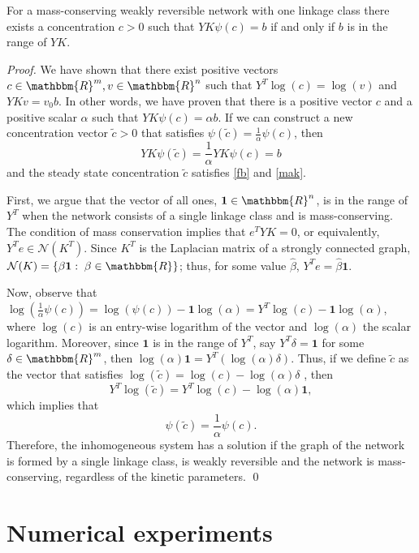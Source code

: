 \documentclass[smallextended]{svjour3}       %
\newcommand*{\0}{\mathbf{0}}
\newcommand*{\1}{\mathbf{1}}
\newcommand*{\R}{\mathbbm{R}}
\begin{document}
\begin{theorem}\label{thm:scaling}
	For a mass-conserving weakly reversible network with one linkage class there exists a
	concentration $c>0$ such that $YK\psi(c) = b$ if and only if $b$ is in the
	range of $YK$. 
\end{theorem}

\begin{proof}
	We have shown that there exist positive vectors $c \in \R^m, v \in \R^n$ such
	that $Y^T \log(c) = \log (v)$ and $Y K v = v_0 b$.  In other words, we have
	proven that there is a positive vector $c$ and a positive scalar $\alpha$
	such that $Y K \psi(c) = \alpha b$.  If we can construct a new
	concentration vector $\tilde c > 0$ that satisfies $\psi(\tilde c) =
	\frac{1}{\alpha}\psi(c)$, then
	\[
		YK\psi(\tilde c) = \frac{1}{\alpha}YK\psi(c) = b
	\]
	and the steady state concentration $\tilde c$ satisfies \eqref{fb} and
	\eqref{mak}.  

	First, we argue that the vector of all ones, $\1 \in \R^n$, is in the range
	of $Y^T$ when the network consists of a single linkage class and
	is mass-conserving. The condition of mass conservation implies that $e^T Y K = 0$, 
	or equivalently, $Y^T e \in \mathcal{N} (K^T)$.  Since $K^T$ is the 
	Laplacian matrix of a strongly connected graph, $\mathcal{N}(K) = \{\beta
	\1 :\; \beta \in \R\}$; thus, for some value $\hat \beta$, $Y^T e = \hat\beta
	\1$. 
	
	Now, observe that $\log\left(\frac{1}{\alpha}\psi(c) \right) =
	\log(\psi(c))-\1\log(\alpha) = Y^T\log(c) - \1\log(\alpha)$, where $\log(c)$
	is an entry-wise logarithm of the vector and $\log(\alpha)$ the scalar
	logarithm. Moreover, since $\1$ is in the range of $Y^T$, say $Y^T \delta =
	\1$ for some $\delta \in \R^m$, then $\log(\alpha)\1 =
	Y^T(\log(\alpha)\delta)$. Thus, if we define $\tilde c$ as the vector that
	satisfies  $\log(\tilde c) = \log(c) - \log(\alpha)\delta$ , then 
	\[
	Y^T\log(\tilde c) = Y^T\log(c) - \log(\alpha)\1,
	\] 
	which implies that 
	\[
	\psi(\tilde c) = \frac{1}{\alpha}\psi(c).
	\] 
	Therefore, the inhomogeneous system has a solution if the graph of
	the network is formed by a single linkage class, is weakly reversible
    and the network is mass-conserving, regardless of the kinetic parameters.
   \qed
\end{proof}


\section{Numerical experiments}
\label{sec:experiments}
\end{document}
